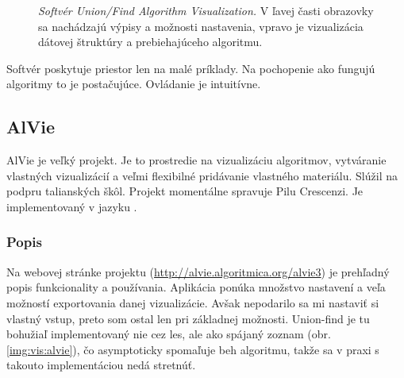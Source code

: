 \begin{figure}
\centering
{}
\caption{\emph{Softvér Union/Find Algorithm Visualization.} V ľavej časti 
obrazovky sa nachádzajú výpisy a možnosti nastavenia, vpravo je vizualizácia 
dátovej štruktúry a prebiehajúceho algoritmu.}
\label{img:vis:ufav}
\end{figure}

Softvér poskytuje priestor len na malé príklady. Na 
pochopenie ako fungujú algoritmy to je postačujúce. Ovládanie je intuitívne.

\subsection{AlVie}\label{sec:alvie}

AlVie je veľký projekt. Je to prostredie na vizualizáciu algoritmov, 
vytváranie vlastných vizualizácií a veľmi flexibilné pridávanie vlastného 
materiálu. Slúžil na podpru talianských škôl. Projekt momentálne spravuje 
Pilu Crescenzi. Je implementovaný v jazyku \Java.

\subsubsection{Popis}
Na webovej stránke projektu (\url{http://alvie.algoritmica.org/alvie3}) je 
prehľadný popis funkcionality a používania. Aplikácia ponúka množstvo 
nastavení a veľa možností exportovania danej vizualizácie. Avšak nepodarilo sa 
mi nastaviť si vlastný vstup, preto som ostal len pri základnej možnosti. 
Union-find je tu bohužiaľ implementovaný nie cez les, ale ako spájaný zoznam 
(obr. \ref{img:vis:alvie}), 
čo asymptoticky spomaľuje beh algoritmu, takže sa v praxi s takouto 
implementáciou nedá stretnúť. 

